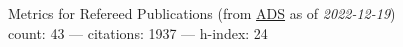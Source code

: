 Metrics for Refereed Publications (from \href{\adsurl}{ADS} as of \textit{2022-12-19}) \\count: 43 --- citations: 1937 --- h-index: 24